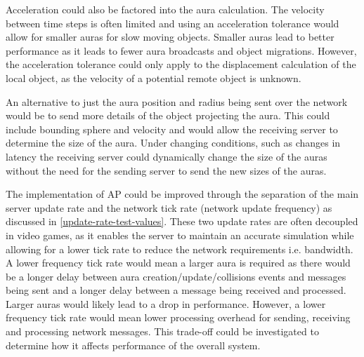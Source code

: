 Acceleration could also be factored into the aura calculation. The velocity between time steps is often limited and using an acceleration tolerance would allow for smaller auras for slow moving objects. Smaller auras lead to better performance as it leads to fewer aura broadcasts and object migrations. However, the acceleration tolerance could only apply to the displacement calculation of the local object, as the velocity of a potential remote object is unknown.

An alternative to just the aura position and radius being sent over the network would be to send more details of the object projecting the aura. This could include bounding sphere and velocity and would allow the receiving server to determine the size of the aura. Under changing conditions, such as changes in latency the receiving server could dynamically change the size of the auras without the need for the sending server to send the new sizes of the auras.

The implementation of AP could be improved through the separation of the main server update rate and the network tick rate (network update frequency) as discussed in \ref{update-rate-test-values}. These two update rates are often decoupled in video games, as it enables the server to maintain an accurate simulation while allowing for a lower tick rate to reduce the network requirements i.e. bandwidth. A lower frequency tick rate would mean a larger aura is required as there would be a longer delay between aura creation/update/collisions events and messages being sent and a longer delay between a message being received and processed. Larger auras would likely lead to a drop in performance. However, a lower frequency tick rate would mean lower processing overhead for sending, receiving and processing network messages. This trade-off could be investigated to determine how it affects performance of the overall system.



